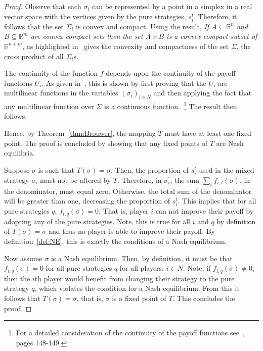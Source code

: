 \begin{proof}
    Observe that each \(\sigma_{i}\) can be represented by a point in a simplex
    in a real vector space with the vertices given by the pure strategies,
    \(s_{i}^{t}\). Therefore, it follows that the set \(\Sigma_{i}\) is convex
    and compact. Using the result, \textit{If \(A \subseteq \mathbb{R}^{n}\) and
    \(B \subseteq \mathbb{R}^{m}\) are convex compact sets then the set \(A
    \times B\) is a convex compact subset of \(\mathbb{R}^{n+m}\)}, as
    highlighted in~\cite{maschler_solan_zamir_2013} gives the convexity and
    compactness of the set \(\Sigma \), the cross product of all
    \(\Sigma_{i}\)s. 
    
    The continuity of the function \(f\) depends upon the continuity of the
    payoff functions \(U_{i}\). As given in~\cite{maschler_solan_zamir_2013},
    this is shown by first proving that the \(U_{i}\) are multilinear functions
    in the variables \((\sigma_{i})_{i \in N}\) and then applying the fact that
    any multilinear function over \(\Sigma \) is a continuous
    function.~\footnote{For a detailed consideration of the continuity of the
    payoff functions see~\cite{maschler_solan_zamir_2013}, pages
    148-149.} The result then follows.

    Hence, by Theorem~\ref{thm:Brouwer}, the mapping \(T\) must have at least
    one fixed point. The proof is concluded by showing that any fixed points of
    \(T\) are Nash equilibria. 

    Suppose \(\sigma \) is such that \(T(\sigma) = \sigma \). Then, the
    proportion of \(s_{i}^{t}\) used in the mixed strategy \(\sigma_{i}\) must
    not be altered by \(T\). Therefore, in \(\sigma_{i}^{\prime}\), the sum
    \(\sum_{t}{f_{i,t}(\sigma)}\), in the denominator, must equal zero.
    Otherwise, the total sum of the denominator will be greater than one,
    decreasing the proportion of \(s_{i}^{t}\). This implies that for all pure
    strategies \(q\), \(f_{i,q}(\sigma)=0\). That is, player \(i\) can not
    improve their payoff by adopting any of the pure strategies. Note, this is
    true for all \(i\) and \(q\) by definition of \(T(\sigma) = \sigma \) and
    thus no player is able to improve their payoff. By definition~\ref{def:NE},
    this is exactly the conditions of a Nash equilibrium.

    Now assume \(\sigma \) is a Nash equilibrium. Then, by definition, it must
    be that \(f_{i,q}(\sigma)=0\) for all pure strategies \(q\) for all players,
    \(i \in N\). Note, if \(f_{i,q}(\sigma) \ne 0\), then the
    \(i\)th player would benefit from changing their strategy to the pure
    strategy \(q\), which violates the condition for a Nash equilibrium. From
    this it follows that \(T(\sigma) = \sigma \), that is, \(\sigma \) is a
    fixed point of \(T\). This concludes the proof.

\end{proof}


